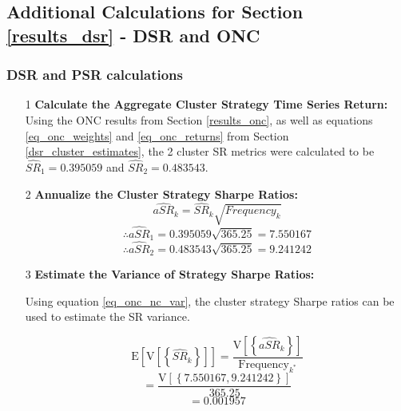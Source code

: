 \documentclass[a4paper,11pt,oneside]{article}
\theoremstyle{plain}
\theoremstyle{definition}
\begin{document}
	
	
	
	
	
	
	\newpage
	\subsection{Additional Calculations for Section \ref{results_dsr} - DSR and ONC}\label{results_dsr_appendix}
	
	
	\subsubsection{DSR and PSR calculations}
	
	\begin{itemize}
		\item [1] \textbf{Calculate the Aggregate Cluster Strategy Time Series Return:} \newline
		Using the ONC results from Section \ref{results_onc}, as well as equations \eqref{eq_onc_weights} and \eqref{eq_onc_returns} from Section \ref{dsr_cluster_estimates}, the 2 cluster SR metrics were calculated to be $\widehat{SR}_{1}={0.395059}$ and 	$\widehat{SR}_{2}={0.483543}$. \newline
		
		\item [2] \textbf{Annualize the Cluster Strategy Sharpe Ratios:} \newline
		\begin{equation}
		\widehat{aSR}_{k}=\widehat{SR}_{k}\sqrt{{Frequency_{k}}}
		\end{equation}
		\begin{equation}
		\therefore \widehat{aSR}_{1}={0.395059}\sqrt{{365.25}}={7.550167}
		\end{equation}
		\begin{equation}
		\therefore \widehat{aSR}_{2}={0.483543}\sqrt{{365.25}} ={9.241242}
		\end{equation}

		\item [3] \textbf{Estimate the Variance of Strategy Sharpe Ratios:} \newline

		Using equation \eqref{eq_onc_nc_var}, the cluster strategy Sharpe ratios can be used to estimate the SR variance. 
		
		\begin{equation}
		\mathrm{E}\left[\mathrm{V}\left[\left\{\widehat{S R}_{k}\right\}\right]\right]=\frac{\mathrm{V}\left[\left\{\widehat{aSR}_{k}\right\}\right]}{\text {Frequency}_{k^{*}}}
		\end{equation}
		\begin{equation}
		=\frac{\mathrm{V}\left[\left\{{7.550167,9.241242} \right\}\right]}{\text {365.25}}
		\end{equation}
		\begin{equation}
		={0.001957}
		\end{equation}
		

\end{itemize}
\end{document}

